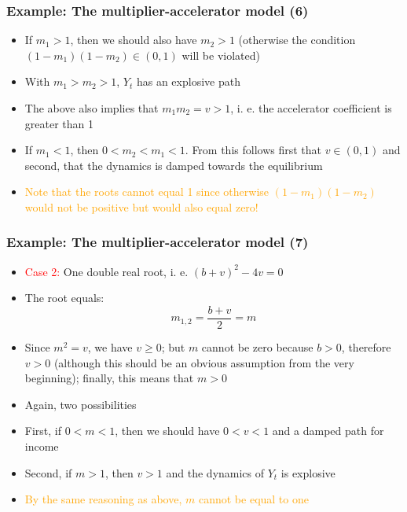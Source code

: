 \documentclass[10pt,usenames,dvipsnames]{beamer}
\theoremstyle{plain}
\theoremstyle{definition}
\begin{document}
\begin{frame}[fragile]
\frametitle{Example: The multiplier-accelerator model (6)}
\begin{itemize}
	\item If \textcolor{mygreen1}{$m_{1} > 1$}, then we should also have $m_{2} > 1$ (otherwise the condition $(1 - m_{1})(1 - m_{2}) \in (0,1)$ will be violated)
	\item With $m_{1} > m_{2} > 1$, $Y_{t}$ has an explosive path
	\item The above also implies that $m_{1}m_{2} = v > 1$, i. e. the accelerator coefficient is greater than 1
	\item If \textcolor{mygreen1}{$m_{1} < 1$}, then $0 < m_{2} < m_{1} < 1$. From this follows first that $v \in (0,1)$ and second, that the dynamics is damped towards the equilibrium
	\item \textcolor{orange}{Note that the roots cannot equal 1 since otherwise $(1 - m_{1})(1 - m_{2})$ would not be positive but would also equal zero!}
\end{itemize}
\end{frame}

\begin{frame}[fragile]
\frametitle{Example: The multiplier-accelerator model (7)}
\begin{itemize}
	\item \textcolor{red}{Case 2:} One double real root, i. e. $(b+v)^{2} - 4v = 0$
	\item The root equals:
	\[
		m_{1,2} = \frac{b + v}{2} = m
	\]
	\item Since $m^{2} = v$, we have $v \geq 0$; but $m$ cannot be zero because $b > 0$, therefore $v > 0$ (although this should be an obvious assumption from the very beginning); finally, this means that $m > 0$
	\item Again, two possibilities
	\item First, if $0 < m < 1$, then we should have $0 < v < 1$ and a damped path for income
	\item Second, if $m > 1$, then $v > 1$ and the dynamics of $Y_{t}$ is explosive
	\item \textcolor{orange}{By the same reasoning as above, $m$ cannot be equal to one} 
\end{itemize}
\end{frame}
\end{document}
